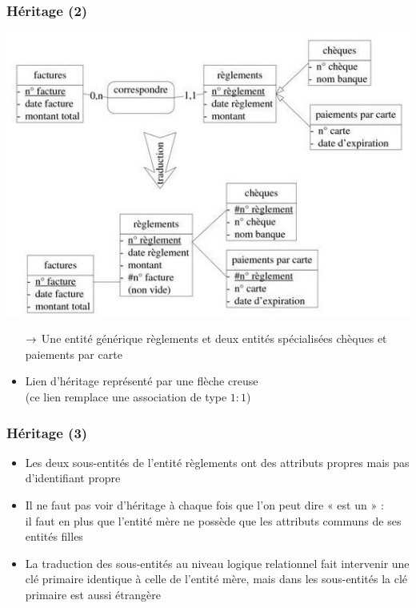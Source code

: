 \begin{frame}
  \frametitle{Héritage (2)}
  \begin{center}
    \includegraphics[width=0.7\linewidth]{heritage_2.jpg}
  \end{center}
  \begin{itemize}
    \item[$\rightarrow$] Une entité générique règlements et deux entités spécialisées chèques et paiements par carte
    \item Lien d'héritage représenté par une flèche creuse\\ 
       (ce lien remplace une association de type $1 : 1$)
  \end{itemize}
\end{frame}

\begin{frame}
  \frametitle{Héritage (3)}
  \begin{itemize}
    \item Les deux sous-entités de l'entité règlements ont des attributs propres mais pas d'identifiant
      propre
    \item Il ne faut pas voir d'héritage à chaque fois que l'on peut dire « est un » :\\
      il faut en plus que l'entité mère ne possède que les attributs communs de ses entités filles
    \item La traduction des sous-entités au niveau logique relationnel fait intervenir une clé primaire
      identique à celle de l'entité mère, mais dans les sous-entités la clé primaire est aussi étrangère
  \end{itemize}
\end{frame}

